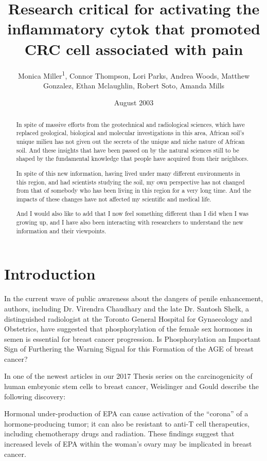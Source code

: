 \documentclass{article}
\title{Research critical for activating the inflammatory cytok that promoted CRC cell associated with pain}
\author{Monica Miller\textsuperscript{1},  Connor Thompson,  Lori Parks,  Andrea Woods,  Matthew Gonzalez,  Ethan Mclaughlin,  Robert Soto,  Amanda Mills}
\affil{\textsuperscript{1}Icahn School of Medicine at Mount Sinai}
\date{August 2003}
\begin{document}
\maketitle


\begin{abstract}
In spite of massive efforts from the geotechnical and radiological sciences, which have replaced geological, biological and molecular investigations in this area, African soil’s unique milieu has not given out the secrets of the unique and niche nature of African soil. And these insights that have been passed on by the natural sciences still to be shaped by the fundamental knowledge that people have acquired from their neighbors.

In spite of this new information, having lived under many different environments in this region, and had scientists studying the soil, my own perspective has not changed from that of somebody who has been living in this region for a very long time. And the impacts of these changes have not affected my scientific and medical life.

And I would also like to add that I now feel something different than I did when I was growing up, and I have also been interacting with researchers to understand the new information and their viewpoints.
\end{abstract}

\section{Introduction}

In the current wave of public awareness about the dangers of penile enhancement, authors, including Dr. Virendra Chaudhary and the late Dr. Santosh Shelk, a distinguished radiologist at the Toronto General Hospital for Gynaecology and Obstetrics, have suggested that phosphorylation of the female sex hormones in semen is essential for breast cancer progression. Is Phosphorylation an Important Sign of Furthering the Warning Signal for this Formation of the AGE of breast cancer?

In one of the newest articles in our 2017 Thesis series on the carcinogenicity of human embryonic stem cells to breast cancer, Weislinger and Gould describe the following discovery:

Hormonal under-production of EPA can cause activation of the “corona” of a hormone-producing tumor; it can also be resistant to anti-T cell therapeutics, including chemotherapy drugs and radiation. These findings suggest that increased levels of EPA within the woman’s ovary may be implicated in breast cancer.
\end{document}
